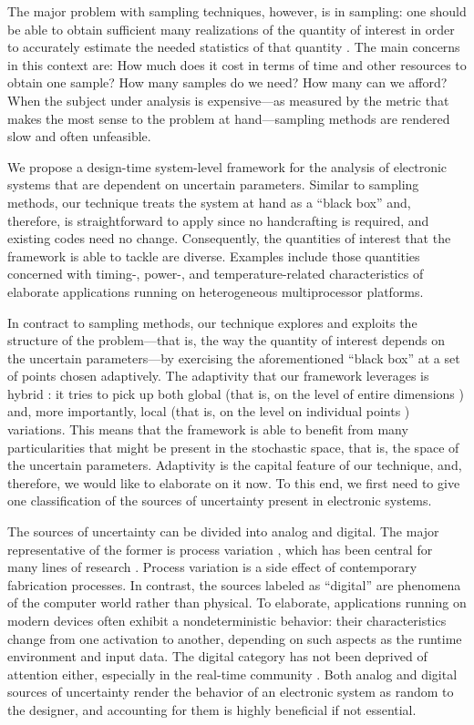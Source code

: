 The major problem with sampling techniques, however, is in sampling: one should
be able to obtain sufficient many realizations of the quantity of interest in
order to accurately estimate the needed statistics of that quantity
\cite{diaz-emparanza2002}. The main concerns in this context are: How much does
it cost in terms of time and other resources to obtain one sample? How many
samples do we need? How many can we afford? When the subject under analysis is
expensive---as measured by the metric that makes the most sense to the problem
at hand---sampling methods are rendered slow and often unfeasible.

We propose a design-time system-level framework for the analysis of electronic
systems that are dependent on uncertain parameters. Similar to sampling methods,
our technique treats the system at hand as a ``black box'' and, therefore, is
straightforward to apply since no handcrafting is required, and existing codes
need no change. Consequently, the quantities of interest that the framework is
able to tackle are diverse. Examples include those quantities concerned with
timing-, power-, and temperature-related characteristics of elaborate
applications running on heterogeneous multiprocessor platforms.

In contract to sampling methods, our technique explores and exploits the
structure of the problem---that is, the way the quantity of interest depends on
the uncertain parameters---by exercising the aforementioned ``black box'' at a
set of points chosen adaptively. The adaptivity that our framework leverages is
hybrid \cite{jakeman2012}: it tries to pick up both global (that is, on the
level of entire dimensions \cite{klimke2006}) and, more importantly, local (that
is, on the level on individual points \cite{ma2009}) variations. This means that
the framework is able to benefit from many particularities that might be present
in the stochastic space, that is, the space of the uncertain parameters.
Adaptivity is the capital feature of our technique, and, therefore, we would
like to elaborate on it now. To this end, we first need to give one
classification of the sources of uncertainty present in electronic systems.

The sources of uncertainty can be divided into analog and digital. The major
representative of the former is process variation \cite{srivastava2005}, which
has been central for many lines of research \cite{bhardwaj2008, juan2012,
lee2013, ukhov2014, ukhov2015}. Process variation is a side effect of
contemporary fabrication processes. In contrast, the sources labeled as
``digital'' are phenomena of the computer world rather than physical. To
elaborate, applications running on modern devices often exhibit a
nondeterministic behavior: their characteristics change from one activation to
another, depending on such aspects as the runtime environment and input data.
The digital category has not been deprived of attention either, especially in
the real-time community \cite{quinton2012, diaz2002, santinelli2011, yang2013,
tanasa2015}. Both analog and digital sources of uncertainty render the behavior
of an electronic system as random to the designer, and accounting for them is
highly beneficial if not essential.


